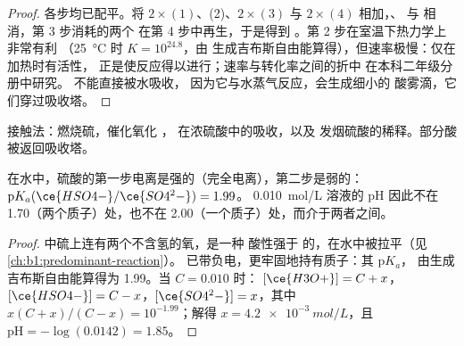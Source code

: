 \begin{proof}
各步均已配平。将 $2\times(1)$、(2)、$2\times(3)$ 与
$2\times(4)$ 相加，、 与  相消，第 3 步消耗的两个
 在第 4 步中再生，于是得到
。第 2 步在室温下热力学上非常有利
（\qty{25}{\celsius} 时 $K = 10^{24.8}$，由
生成吉布斯自由能算得），但速率极慢：仅在加热时有活性，
正是使反应得以进行；速率与转化率之间的折中
在本科二年级分册中研究。 不能直接被水吸收，
因为它与水蒸气反应，会生成细小的
酸雾滴，它们穿过吸收塔。
\end{proof}

\begin{omfigure}

{\small 接触法：燃烧硫，催化氧化
， 在浓硫酸中的吸收，以及
发烟硫酸的稀释。部分酸被返回吸收塔。}
\end{omfigure}

\begin{proposition}[硫酸的强度]\label{prop:b1:p-block-16-18:sulfuric-strength}
在水中，硫酸的第一步电离是强的（完全电离），第二步是弱的：
$\mathrm{p}K_a(\ce{HSO4-}/\ce{SO4^2-}) = 1.99$。
\qty{0.010}{mol/L} 溶液的 pH 因此不在 1.70（两个质子）处，也不在
2.00（一个质子）处，而介于两者之间。
\end{proposition}

\begin{proof}
 中硫上连有两个不含氢的氧，是一种
酸性强于  的，在水中被拉平（见\cref{ch:b1:predominant-reaction}）。
 已带负电，更牢固地持有质子：其 $\mathrm{p}K_a$，
由生成吉布斯自由能算得为 1.99。当 $C = 0.010$ 时：
$[\ce{H3O+}] = C + x$，$[\ce{HSO4-}] = C - x$，$[\ce{SO4^2-}] = x$，其中
$x(C + x)/(C - x) = 10^{-1.99}$；解得 $x = \qty{4.2e-3}{mol/L}$，且
$\mathrm{pH} = -\log(0.0142) = 1.85$。
\end{proof}


